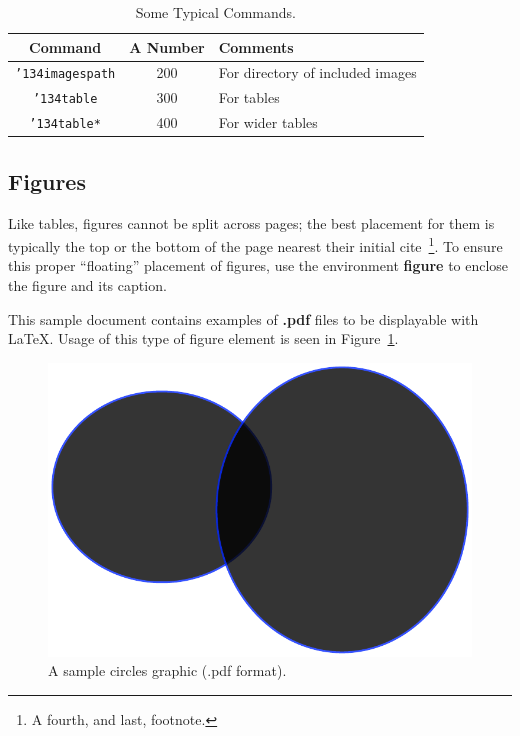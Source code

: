 \documentclass[article]{stucosrec}
\begin{document}
	\begin{table}
		\centering
		\caption{Some Typical Commands.}
		\label{tab:table2}
		\begin{tabular}{|c|c|l|} \hline
			Command&A Number&Comments\\ \hline
			\texttt{{\char'134}imagespath} & 200 & For directory of included images \\ \hline
			\texttt{{\char'134}table} & 300 & For tables\\ \hline
			\texttt{{\char'134}table*} & 400& For wider tables\\ \hline
		\end{tabular}
	\end{table}
	
	\subsection{Figures}
	
	Like tables, figures cannot be split across pages; the best placement for them is typically the top or the bottom of the page nearest their initial cite~\footnote{A fourth, and last, footnote.}.
	To ensure this proper ``floating'' placement of figures, use the environment \textbf{figure} to enclose the figure and its caption.
	
	This sample document contains examples of \textbf{.pdf} files to be displayable with \LaTeX.
	Usage of this type of figure element is seen in Figure~\ref{fig:circles}.
	
	\begin{figure}
		\centering
		\includegraphics[scale=0.5]{circles.pdf}
		\caption{A sample circles graphic (.pdf format).}
		\label{fig:circles}
	\end{figure}
\end{document}

